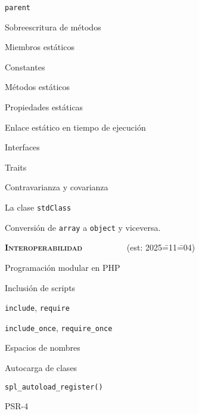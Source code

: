 \begin{longenum}
\begin{longenum}
\begin{longenum}
            \item \texttt{parent}
            \item Sobreescritura de métodos
        \end{longenum}
        \item Miembros estáticos
        \begin{longenum}
            \item Constantes
            \item Métodos estáticos
            \item Propiedades estáticas
            \item Enlace estático en tiempo de ejecución
        \end{longenum}
        \item Interfaces
        \item Traits
        \item Contravarianza y covarianza
        \item La clase \texttt{stdClass}
        \begin{longenum}
            \item Conversión de \texttt{array} a \texttt{object} y viceversa.
        \end{longenum}
    \end{longenum}
    \item \textbf{\textsc{Interoperabilidad}} \ \ \ \ \ \ \ \ \ \ (est: 2025\==11\==04)
    \begin{longenum}
        \item Programación modular en PHP
        \begin{longenum}
            \item Inclusión de scripts
            \begin{longenum}
                \item \texttt{include}, \texttt{require}
                \item \texttt{include\_once}, \texttt{require\_once}
            \end{longenum}
            \item Espacios de nombres
            \item Autocarga de clases
            \begin{longenum}
                \item \texttt{spl\_autoload\_register()}
                \item PSR-4
            \end{longenum}

\end{longenum}
\end{longenum}
\end{longenum}
